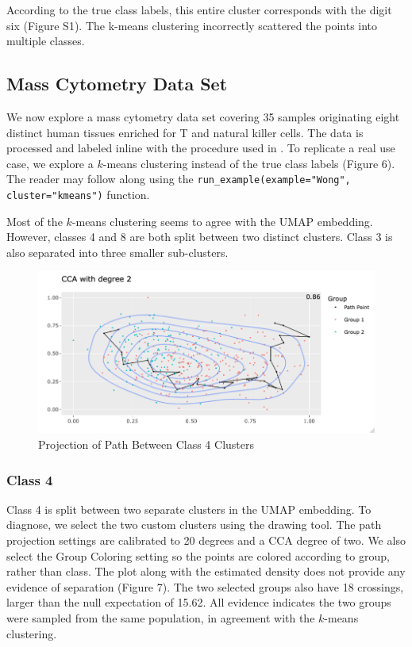\documentclass{article}
\begin{document}
{According to the true class labels, this entire cluster corresponds with the digit six (Figure S1). The k-means clustering incorrectly scattered the points into multiple classes.

\subsection{Mass Cytometry Data Set}
We now explore a mass cytometry data set \cite{Wong_data_set} covering 35 samples originating eight distinct human tissues enriched for T and natural killer cells. The data is processed and labeled inline with the procedure used in \cite{UMAP_example}. To replicate a real use case, we explore a $k$-means clustering instead of the true class labels (Figure 6). The reader may follow along using the \texttt{run\_example(example="Wong", cluster="kmeans")} function.

Most of the $k$-means clustering seems to agree with the UMAP embedding. However, classes 4 and 8 are both split between two distinct clusters. Class 3 is also separated into three smaller sub-clusters.

\renewcommand{\figurename}{Figure}
\renewcommand{\thefigure}{7}
\begin{figure}[!t]
\centering
\includegraphics[scale=0.47]{class 4 projection Wong}
\caption{Projection of Path Between Class 4 Clusters}
\end{figure}

\subsubsection{Class 4}
Class 4 is split between two separate clusters in the UMAP embedding. To diagnose, we select the two custom clusters using the drawing tool. The path projection settings are calibrated to 20 degrees and a CCA degree of two. We also select the Group Coloring setting so the points are colored according to group, rather than class. The plot along with the estimated density does not provide any evidence of separation (Figure 7). The two selected groups also have 18 crossings, larger than the null expectation of 15.62. All evidence indicates the two groups were sampled from the same population, in agreement with the $k$-means clustering.

}
\end{document}
